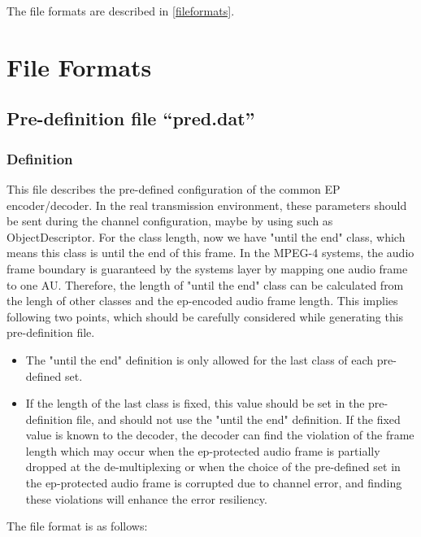 \documentclass[a4paper]{article}
\begin{document}
  The file formats are described in \ref{fileformats}.

\section{File Formats \label{fileformats}}
\subsection{Pre-definition file ``pred.dat''}

\subsubsection{Definition}
This file describes the pre-defined configuration of the common EP encoder/decoder. In the real transmission environment, these parameters should be sent during the channel configuration, maybe by using such as ObjectDescriptor.
  For the class length, now we have "until the end" class, which means this class is until the end of this frame. In the MPEG-4 systems, the audio frame boundary is guaranteed by the systems layer by mapping one audio frame to one AU. Therefore, the length of "until the end" class can be calculated from the lengh of other classes and the ep-encoded audio frame length. 
  This implies following two points, which should be carefully considered while generating this pre-definition file.\\
\begin{itemize}
\item The "until the end" definition is only allowed for the last class of each pre-defined set.
\item If the length of the last class is fixed, this value should be set
  in the pre-definition file, and should not use the "until the end"
  definition. If the fixed value is known to the decoder, the decoder
  can find the violation of the frame length which may occur when the
  ep-protected audio frame is partially dropped at the de-multiplexing
  or when the choice of the pre-defined set in the ep-protected audio
  frame is corrupted due to channel error, and finding these violations
  will enhance the error resiliency.
\end{itemize}

The file format is as follows:
\end{document}
